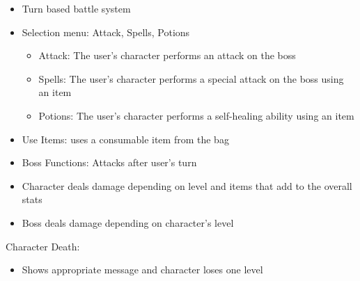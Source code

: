 \documentclass[12pt]{report}
\renewcommand{\_}{\kern-1.5pt\textunderscore\kern-1.5pt}
\begin{document}
\begin{itemize}
	\item Turn based battle system\par

	\item Selection menu: Attack, Spells, Potions\par

\begin{itemize}
	\item Attack: The user’s character performs an attack on the boss\par

	\item Spells: The user’s character performs a special attack on the boss using an item\par

	\item Potions: The user’s character performs a self-healing ability using an item \par


\end{itemize}
	\item Use Items: uses a consumable item from the bag \par

	\item Boss Functions: Attacks after user’s turn\par

	\item Character deals damage depending on level and items that add to the overall stats\par

	\item Boss deals damage depending on character’s level
\end{itemize}\par


\vspace{\baselineskip}

\vspace{\baselineskip}

\vspace{\baselineskip}

\vspace{\baselineskip}
Character Death:\par

\begin{itemize}
	\item Shows appropriate message and character loses one level
\end{itemize}\par
\end{document}
